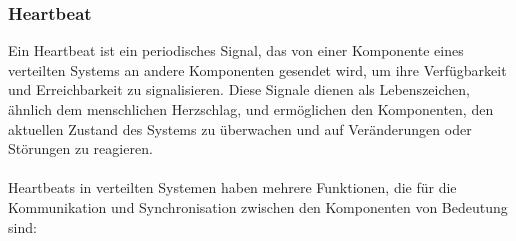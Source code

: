 \subsubsection{Heartbeat}

Ein Heartbeat ist ein periodisches Signal, das von einer Komponente eines verteilten Systems an andere Komponenten gesendet wird, um ihre  Verfügbarkeit und Erreichbarkeit zu signalisieren. Diese Signale dienen als Lebenszeichen, ähnlich dem menschlichen Herzschlag, und ermöglichen den Komponenten, den aktuellen Zustand des Systems zu überwachen und auf Veränderungen oder Störungen zu reagieren.
\\\\
Heartbeats in verteilten Systemen haben mehrere Funktionen, die für die Kommunikation und Synchronisation zwischen den Komponenten von Bedeutung sind:

